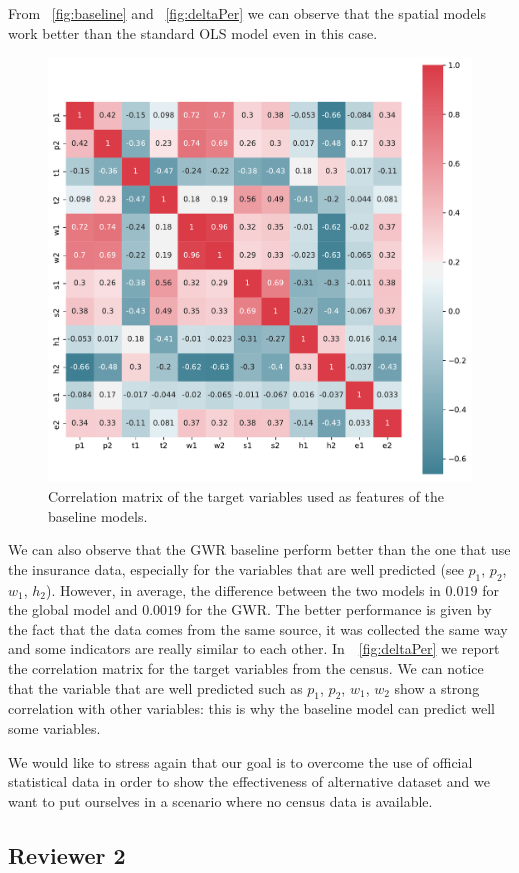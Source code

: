 \documentclass[12pt]{article}
\begin{document}
From \figurename~\ref{fig:baseline} and \figurename~\ref{fig:deltaPer}  we can observe that the spatial models work better than the standard OLS model even in this case. 

\begin{figure}[h!]
    \centering
    \includegraphics[width=.7\linewidth]{figures/correlationTargets.pdf}
\caption{Correlation matrix of the target variables used as features of the baseline models.}
\label{fig:corrTarg}  
\end{figure}

We can also observe that the GWR baseline perform better than the one that use the insurance data, especially for the variables that are well predicted (see $p_1$, $p_2$, $w_1$, $h_2$). However,  in average, the difference between the two models in $0.019$ for the global model and $0.0019 $ for the GWR. The better performance is given by the fact that the data comes from the same source, it was collected the same way and some indicators are really similar to each other.  In~\figurename~\ref{fig:deltaPer} we report the correlation matrix for the target variables from the census. We can notice that the variable that are well predicted such as $p_1$, $p_2$, $w_1$, $w_2$ show a strong correlation with other variables: this is why the baseline model can predict  well some variables.


We would like to stress again that our goal is to overcome the use of official statistical data in order to show the effectiveness of alternative dataset and we want to put ourselves in a scenario where no census data is available.

\subsection*{Reviewer 2}
\end{document}
